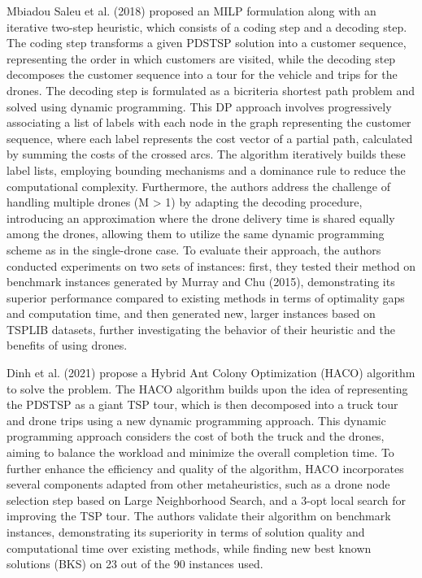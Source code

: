 \documentclass{article}
\begin{document}
	 \par
	 Mbiadou Saleu et al. (2018) \cite{MbiadouSaleu2018} proposed an MILP formulation along with an iterative two-step heuristic, which consists of a coding step and a decoding step. The coding step transforms a given PDSTSP solution into a customer sequence, representing the order in which customers are visited, while the decoding step decomposes the customer sequence into a tour for the vehicle and trips for the drones. The decoding step is formulated as a bicriteria shortest path problem and solved using dynamic programming. This DP approach involves progressively associating a list of labels with each node in the graph representing the customer sequence, where each label represents the cost vector of a partial path, calculated by summing the costs of the crossed arcs. The algorithm iteratively builds these label lists, employing bounding mechanisms and a dominance rule to reduce the computational complexity. Furthermore, the authors address the challenge of handling multiple drones (M > 1) by adapting the decoding procedure, introducing an approximation where the drone delivery time is shared equally among the drones, allowing them to utilize the same dynamic programming scheme as in the single-drone case. To evaluate their approach, the authors conducted experiments on two sets of instances: first, they tested their method on benchmark instances generated by Murray and Chu (2015), demonstrating its superior performance compared to existing methods in terms of optimality gaps and computation time, and then generated new, larger instances based on TSPLIB datasets, further investigating the behavior of their heuristic and the benefits of using drones.
	 \par 
	 Dinh et al. (2021) \cite{Dinh2021} propose a Hybrid Ant Colony Optimization (HACO) algorithm to solve the problem. The HACO algorithm builds upon the idea of representing the PDSTSP as a giant TSP tour, which is then decomposed into a truck tour and drone trips using a new dynamic programming approach. This dynamic programming approach considers the cost of both the truck and the drones, aiming to balance the workload and minimize the overall completion time. To further enhance the efficiency and quality of the algorithm, HACO incorporates several components adapted from other metaheuristics, such as a drone node selection step based on Large Neighborhood Search, and a 3-opt local search for improving the TSP tour. The authors validate their algorithm on benchmark instances, demonstrating its superiority in terms of solution quality and computational time over existing methods, while finding new best known solutions (BKS) on 23 out of the 90 instances used.
\end{document}
